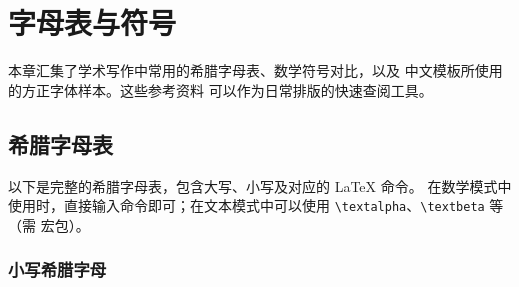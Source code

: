 
\setchapterpreamble[u]{\margintoc}
\chapter{字母表与符号}

本章汇集了学术写作中常用的希腊字母表、数学符号对比，以及
 中文模板所使用的方正字体样本。这些参考资料
可以作为日常排版的快速查阅工具。


\section{希腊字母表}


以下是完整的希腊字母表，包含大写、小写及对应的 \LaTeX{} 命令。
在数学模式中使用时，直接输入命令即可；在文本模式中可以使用
\lstinline|\textalpha|、\lstinline|\textbeta| 等（需
 宏包）。

\subsection{小写希腊字母}

